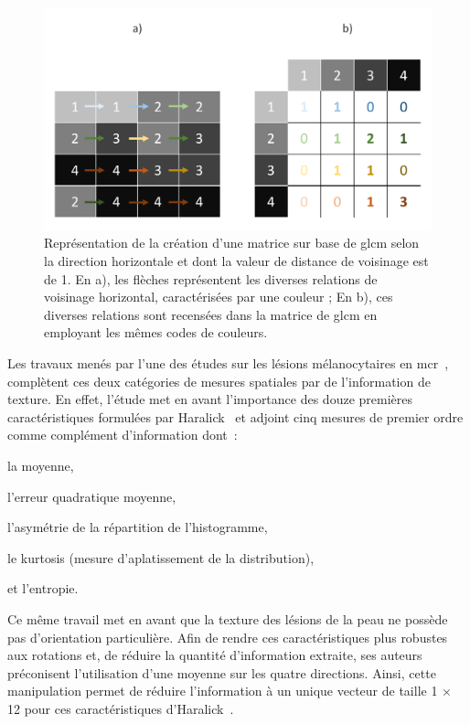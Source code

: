 \begin{figure}[H]
    \centering
    \includegraphics[width=\linewidth]{contents/chapter_5/resources/scheme_principle_GLCM.pdf}
    \caption{Représentation de la création d'une matrice sur base de \gls{glcm} selon la direction horizontale et dont la valeur de distance de voisinage est de 1. En a), les flèches représentent les diverses relations de voisinage horizontal, caractérisées par une couleur ; En b), ces diverses relations sont recensées dans la matrice de \gls{glcm} en employant les mêmes codes de couleurs.}
    \label{fig:scheme_principle_GLCM}
\end{figure}\par

Les travaux menés par l'une des études sur les lésions mélanocytaires en \gls{mcr}~\cite{Wiltgen2008}, complètent ces deux catégories de mesures spatiales par de l'information de texture. En effet, l'étude met en avant l'importance des douze premières caractéristiques formulées par Haralick~\cite{Haralick1973} et adjoint cinq mesures de premier ordre comme complément d'information dont~:
\begin{inlinerate}
    \item la moyenne,
    \item l'erreur quadratique moyenne,
    \item l'asymétrie de la répartition de l'histogramme,
    \item le kurtosis (mesure d'aplatissement de la distribution),
    \item et l'entropie.
\end{inlinerate}
Ce même travail met en avant que la texture des lésions de la peau ne possède pas d'orientation particulière. Afin de rendre ces caractéristiques plus robustes aux rotations et, de réduire la quantité d'information extraite, ses auteurs préconisent l'utilisation d'une moyenne sur les quatre directions. Ainsi, cette manipulation permet de réduire l'information à un unique vecteur de taille 1 $\times$ 12 pour ces caractéristiques d'Haralick~.\par

